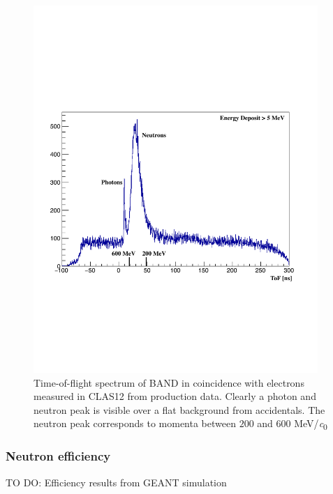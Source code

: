 \documentclass[3p,final,twocolumn]{elsarticle}
\begin{document}
{\begin{figure}[h!]
	\centering
		\includegraphics[width=0.96\textwidth]{tof-labels.pdf}
	\caption{Time-of-flight spectrum of BAND in coincidence with electrons measured in CLAS12 from production data. Clearly a photon and neutron peak is visible over a flat background from accidentals. The neutron peak corresponds to momenta  between $200$ and $600$ \si{\MeV/\clight}}
	\label{fig:tof}
\end{figure}

\subsubsection{Neutron efficiency}
TO DO: Efficiency results from GEANT simulation




}
\end{document}
